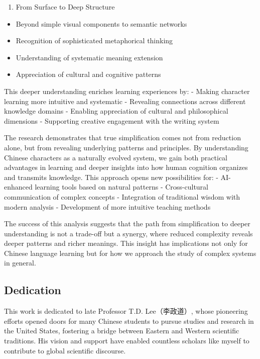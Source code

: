 \begin{enumerate}
\def\labelenumi{\arabic{enumi}.}
\setcounter{enumi}{3}
\tightlist
\item
  From Surface to Deep Structure
\end{enumerate}

\begin{itemize}
\tightlist
\item
  Beyond simple visual components to semantic networks
\item
  Recognition of sophisticated metaphorical thinking
\item
  Understanding of systematic meaning extension
\item
  Appreciation of cultural and cognitive patterns
\end{itemize}

This deeper understanding enriches learning experiences by: - Making
character learning more intuitive and systematic - Revealing connections
across different knowledge domains - Enabling appreciation of cultural
and philosophical dimensions - Supporting creative engagement with the
writing system

The research demonstrates that true simplification comes not from
reduction alone, but from revealing underlying patterns and principles.
By understanding Chinese characters as a naturally evolved system, we
gain both practical advantages in learning and deeper insights into how
human cognition organizes and transmits knowledge. This approach opens
new possibilities for: - AI-enhanced learning tools based on natural
patterns - Cross-cultural communication of complex concepts -
Integration of traditional wisdom with modern analysis - Development of
more intuitive teaching methods

The success of this analysis suggests that the path from simplification
to deeper understanding is not a trade-off but a synergy, where reduced
complexity reveals deeper patterns and richer meanings. This insight has
implications not only for Chinese language learning but for how we
approach the study of complex systems in general.

\hypertarget{dedication}{%
\subsection{Dedication}\label{dedication}}

This work is dedicated to late Professor T.D. Lee（李政道）, whose
pioneering efforts opened doors for many Chinese students to pursue
studies and research in the United States, fostering a bridge between
Eastern and Western scientific traditions. His vision and support have
enabled countless scholars like myself to contribute to global
scientific discourse.

